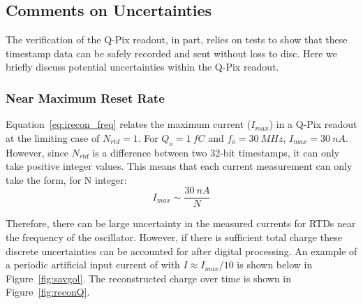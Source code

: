 \subsection{Comments on Uncertainties}

The verification of the Q-Pix readout, in part, relies on tests to show that these timestamp data can be safely recorded and sent without loss to disc.
Here we briefly discuss potential uncertainties within the Q-Pix readout.

\subsubsection{Near Maximum Reset Rate}

Equation~\ref{eq:irecon_freq} relates the maximum current ($I_{max}$) in a Q-Pix readout at the limiting case of $N_{rtd} = 1$.
For $Q_{o} = 1~\unit{fC}$ and $f_{o} = 30~\unit{MHz}$, $I_{max} = 30~\unit{nA}$.
However, since $N_{rtd}$ is a difference between two 32-bit timestamps, it can only take positive integer values.
This means that each current measurement can only take the form, for N integer: 
$$
I_{max} \sim \frac{30~\unit{nA}}{N}
$$

Therefore, there can be large uncertainty in the measured currents for RTDs near the frequency of the oscillator.
However, if there is sufficient total charge these discrete uncertainties can be accounted for after digital processing.
An example of a periodic artificial input current of with $I \approx I_{max}/10$ is shown below in Figure~\ref{fig:savgol}.
The reconstructed charge over time is shown in Figure~\ref{fig:reconQ}.

